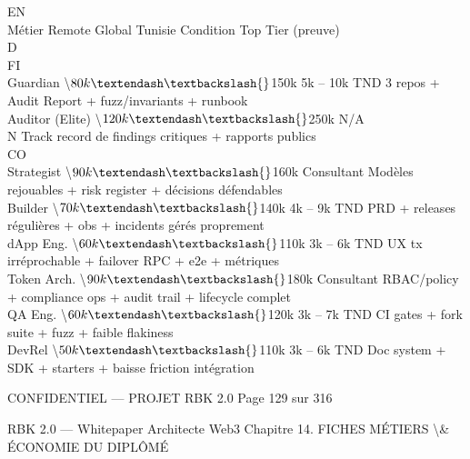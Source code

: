 \documentclass[12pt,landscape,a4paper]{article}
\newenvironment{confidential}
{\begin{tcolorbox}[
    colback=rbkred!5!white,
    colframe=rbkred!75!black,
    title=CONFIDENTIEL,
    fonttitle=\bfseries\color{white},
    coltitle=rbkred!75!black,
    breakable,
    enhanced,
    frame hidden,
    borderline west={2pt}{0pt}{rbkred!75!black}
]}
{\end{tcolorbox}}
\begin{document}
EN\\
Métier          Remote Global Tunisie          Condition Top Tier (preuve)\\
\vspace{0.5em}
\vspace{0.5em}
\vspace{0.5em}
\vspace{0.5em}
D\\
FI\\
Guardian        \textbackslash{}$80k – \textbackslash{}$150k    5k – 10k TND 3 repos + Audit Report + fuzz/invariants + runbook\\
\vspace{0.5em}
Auditor (Elite) \textbackslash{}$120k – \textbackslash{}$250k N/A\\
N           Track record de findings critiques + rapports publics\\
CO\\
Strategist      \textbackslash{}$90k – \textbackslash{}$160k    Consultant     Modèles rejouables + risk register + décisions défendables\\
\vspace{0.5em}
Builder         \textbackslash{}$70k – \textbackslash{}$140k    4k – 9k TND    PRD + releases régulières + obs + incidents gérés proprement\\
\vspace{0.5em}
dApp Eng.       \textbackslash{}$60k – \textbackslash{}$110k    3k – 6k TND    UX tx irréprochable + failover RPC + e2e + métriques\\
\vspace{0.5em}
Token Arch.     \textbackslash{}$90k – \textbackslash{}$180k    Consultant     RBAC/policy + compliance ops + audit trail + lifecycle complet\\
\vspace{0.5em}
QA Eng.         \textbackslash{}$60k – \textbackslash{}$120k    3k – 7k TND    CI gates + fork suite + fuzz + faible flakiness\\
\vspace{0.5em}
DevRel          \textbackslash{}$50k – \textbackslash{}$110k    3k – 6k TND    Doc system + SDK + starters + baisse friction intégration\\
\vspace{0.5em}
\vspace{0.5em}
\vspace{0.5em}
\vspace{0.5em}
\begin{confidential}CONFIDENTIEL — PROJET RBK 2.0                                   Page 129 sur 316\end{confidential}
RBK 2.0 — Whitepaper Architecte Web3                                                   Chapitre 14. FICHES MÉTIERS \textbackslash{}& ÉCONOMIE DU DIPLÔMÉ\\
\vspace{0.5em}
\vspace{0.5em}
\end{document}
